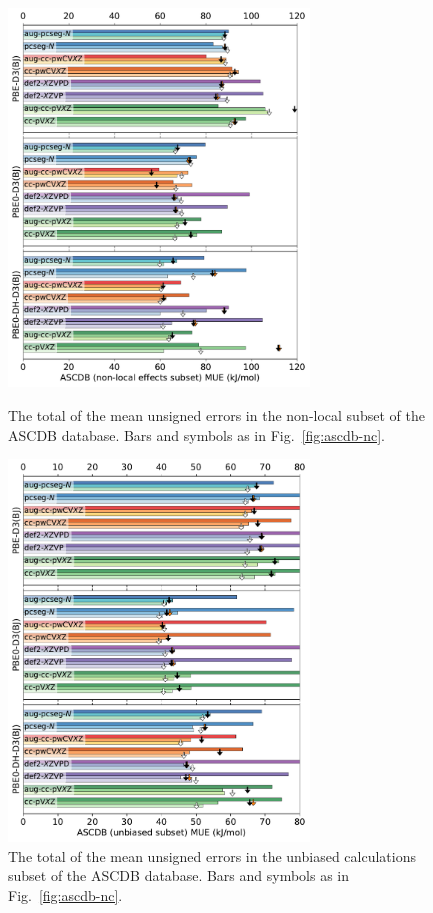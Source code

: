 \documentclass[12pt]{article}
\begin{document}
\begin{figure}[p]
    \centering
    \includegraphics[width=8cm]{../output/fig_ascdb_nl.pdf}
    \caption{The total of the mean unsigned errors in the non-local subset of the ASCDB database. Bars and symbols as in Fig.~\ref{fig:ascdb-nc}.}
    \vspace{1em}
    \includegraphics[width=8cm]{../output/fig_ascdb_ub.pdf}
    \caption{The total of the mean unsigned errors in the unbiased calculations subset of the ASCDB database. Bars and symbols as in Fig.~\ref{fig:ascdb-nc}.}
\end{figure}
\end{document}
